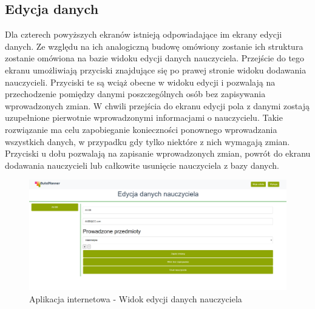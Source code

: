 \subsection{Edycja danych}
Dla czterech powyższych ekranów istnieją odpowiadające im ekrany edycji danych. Ze względu na ich analogiczną budowę omówiony zostanie ich struktura zostanie omówiona na bazie widoku edycji danych nauczyciela. Przejście do tego ekranu umożliwiają przyciski znajdujące się po prawej stronie widoku dodawania nauczycieli. Przyciski te są wciąż obecne w widoku edycji i pozwalają na przechodzenie pomiędzy danymi poszczególnych osób bez zapisywania wprowadzonych zmian. W chwili przejścia do ekranu edycji pola z danymi zostają uzupełnione pierwotnie wprowadzonymi informacjami o nauczycielu. Takie rozwiązanie ma celu zapobieganie konieczności ponownego wprowadzania wszystkich danych, w przypadku gdy tylko niektóre z nich wymagają zmian. Przyciski u dołu pozwalają na zapisanie wprowadzonych zmian, powrót do ekranu dodawania nauczycieli lub całkowite usunięcie nauczyciela z bazy danych.
\begin{figure}[!ht]
\centering\includegraphics[width=\textwidth]{figures/edit}
\caption{Aplikacja internetowa - Widok edycji danych nauczyciela}\label{rys:edit}
\end{figure}




